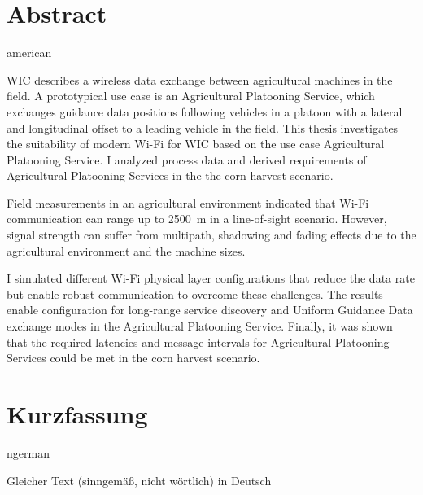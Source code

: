 \chapter*{Abstract}
\begin{otherlanguage*}{american}

\begin{comment}
    about 1/2 page:
\begin{enumerate}
    \item Motivation (Why do we care?)
    \item Problem statement (What problem are we trying to solve?)
    \item Approach (How did we go about it)
    \item Results (What's the answer?)
    \item Conclusion (What are the implications of the answer?)
\end{enumerate}

The abstract is a miniature version of the thesis.
It should be treated as an entirely separate document.
Do not assume that a reader who has access to an abstract will also have access to the thesis.
Do not assume that a reader who reads the thesis has read the abstract.

\end{comment}


\ac{WIC} describes a wireless data exchange between agricultural machines in the field.
A prototypical use case is an Agricultural Platooning Service, which exchanges guidance data positions following
vehicles in a platoon with a lateral and longitudinal offset to a leading vehicle in the field.
This thesis investigates the suitability of modern Wi-Fi for \ac{WIC} based on the use case Agricultural Platooning Service.
I analyzed process data and derived requirements of Agricultural Platooning Services in the the corn harvest scenario.

Field measurements in an agricultural environment indicated that Wi-Fi communication can range up to \SI{2500}{\metre} in
a line-of-sight scenario.
However, signal strength can suffer from multipath, shadowing and fading effects due to the
agricultural environment and the machine sizes.


I simulated different Wi-Fi physical layer configurations that reduce the data rate but
enable robust communication to overcome these challenges.
The results enable configuration for long-range service discovery and Uniform Guidance Data exchange modes
in the Agricultural Platooning Service.
Finally, it was shown that the required latencies and message intervals for Agricultural Platooning Services could be met in the corn harvest
scenario.

\end{otherlanguage*}

\chapter*{Kurzfassung}
\begin{otherlanguage*}{ngerman}

Gleicher Text (sinngemäß, nicht wörtlich) in Deutsch

\end{otherlanguage*}
\acresetall

\cleardoublepage
